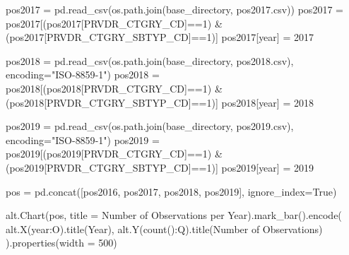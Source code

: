 \documentclass[
  letterpaper,
  DIV=11,
  numbers=noendperiod]{scrartcl}
\newenvironment{Shaded}{\begin{snugshade}}{\end{snugshade}}
\newcommand{\DecValTok}[1]{\textcolor[rgb]{0.68,0.00,0.00}{#1}}
\newcommand{\NormalTok}[1]{\textcolor[rgb]{0.00,0.23,0.31}{#1}}
\newcommand{\OperatorTok}[1]{\textcolor[rgb]{0.37,0.37,0.37}{#1}}
\newcommand{\StringTok}[1]{\textcolor[rgb]{0.13,0.47,0.30}{#1}}
\newcommand{\VariableTok}[1]{\textcolor[rgb]{0.07,0.07,0.07}{#1}}
\begin{document}
\begin{Shaded}
\begin{Highlighting}[]
\NormalTok{pos2017 }\OperatorTok{=}\NormalTok{ pd.read\_csv(os.path.join(base\_directory, }\StringTok{\textquotesingle{}pos2017.csv\textquotesingle{}}\NormalTok{))}
\NormalTok{pos2017 }\OperatorTok{=}\NormalTok{ pos2017[(pos2017[}\StringTok{\textquotesingle{}PRVDR\_CTGRY\_CD\textquotesingle{}}\NormalTok{]}\OperatorTok{==}\DecValTok{1}\NormalTok{) }\OperatorTok{\&}\NormalTok{ (pos2017[}\StringTok{\textquotesingle{}PRVDR\_CTGRY\_SBTYP\_CD\textquotesingle{}}\NormalTok{]}\OperatorTok{==}\DecValTok{1}\NormalTok{)]}
\NormalTok{pos2017[}\StringTok{\textquotesingle{}year\textquotesingle{}}\NormalTok{] }\OperatorTok{=} \DecValTok{2017}

\NormalTok{pos2018 }\OperatorTok{=}\NormalTok{ pd.read\_csv(os.path.join(base\_directory, }\StringTok{\textquotesingle{}pos2018.csv\textquotesingle{}}\NormalTok{), encoding}\OperatorTok{=}\StringTok{"ISO{-}8859{-}1"}\NormalTok{)}
\NormalTok{pos2018 }\OperatorTok{=}\NormalTok{ pos2018[(pos2018[}\StringTok{\textquotesingle{}PRVDR\_CTGRY\_CD\textquotesingle{}}\NormalTok{]}\OperatorTok{==}\DecValTok{1}\NormalTok{) }\OperatorTok{\&}\NormalTok{ (pos2018[}\StringTok{\textquotesingle{}PRVDR\_CTGRY\_SBTYP\_CD\textquotesingle{}}\NormalTok{]}\OperatorTok{==}\DecValTok{1}\NormalTok{)]}
\NormalTok{pos2018[}\StringTok{\textquotesingle{}year\textquotesingle{}}\NormalTok{] }\OperatorTok{=} \DecValTok{2018}

\NormalTok{pos2019 }\OperatorTok{=}\NormalTok{ pd.read\_csv(os.path.join(base\_directory, }\StringTok{\textquotesingle{}pos2019.csv\textquotesingle{}}\NormalTok{), encoding}\OperatorTok{=}\StringTok{"ISO{-}8859{-}1"}\NormalTok{)}
\NormalTok{pos2019 }\OperatorTok{=}\NormalTok{ pos2019[(pos2019[}\StringTok{\textquotesingle{}PRVDR\_CTGRY\_CD\textquotesingle{}}\NormalTok{]}\OperatorTok{==}\DecValTok{1}\NormalTok{) }\OperatorTok{\&}\NormalTok{ (pos2019[}\StringTok{\textquotesingle{}PRVDR\_CTGRY\_SBTYP\_CD\textquotesingle{}}\NormalTok{]}\OperatorTok{==}\DecValTok{1}\NormalTok{)]}
\NormalTok{pos2019[}\StringTok{\textquotesingle{}year\textquotesingle{}}\NormalTok{] }\OperatorTok{=} \DecValTok{2019}

\NormalTok{pos }\OperatorTok{=}\NormalTok{ pd.concat([pos2016, pos2017, pos2018, pos2019], ignore\_index}\OperatorTok{=}\VariableTok{True}\NormalTok{)}


\NormalTok{alt.Chart(pos, title }\OperatorTok{=} \StringTok{\textquotesingle{}Number of Observations per Year\textquotesingle{}}\NormalTok{).mark\_bar().encode(}
\NormalTok{  alt.X(}\StringTok{\textquotesingle{}year:O\textquotesingle{}}\NormalTok{).title(}\StringTok{\textquotesingle{}Year\textquotesingle{}}\NormalTok{),}
\NormalTok{  alt.Y(}\StringTok{\textquotesingle{}count():Q\textquotesingle{}}\NormalTok{).title(}\StringTok{\textquotesingle{}Number of Observations\textquotesingle{}}\NormalTok{)}
\NormalTok{).properties(width }\OperatorTok{=} \DecValTok{500}\NormalTok{)}
\end{Highlighting}
\end{Shaded}
\end{document}
